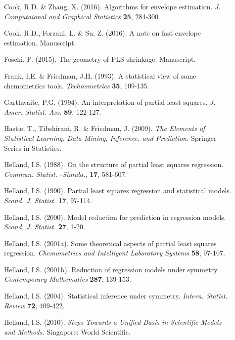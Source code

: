 \documentclass[11pt]{article}
\begin{document}
\begin{description}
\item[] Cook, R.D. \& Zhang, X. (2016). Algorithms for envelope estimation. \textit{J. Computaional and Graphical Statistics} \textbf{25}, 284-300.

\item[] Cook, R.D., Forzani, L. \& Su, Z. (2016). A note on fast envelope estimation. Manuscript.

\item[] Foschi, P. (2015). The geometry of PLS shrinkage. Manuscript.

\item[] Frank, I.E. \& Friedman, J.H. (1993). A statistical view of some chemometrics tools. \textit{Technometrics} \textbf{35}, 109-135.

\item[] Garthwaite, P.G. (1994). An interpretation of partial least squares. \textit{J. Amer. Statist. Ass.} \textbf{89}, 122-127.

\item[] Hastie, T., Tibshirani, R. \& Friedman, J. (2009). \textit{The Elements of Statistical Learning. Data Mining, Inference, and Prediction.} Springer Series in Statistics.


\item[] Helland, I.S. (1988). On the structure of partial least squares regression. \textit{Commun. Statist. -Simula.,} \textbf{17}, 581-607.

\item[] Helland, I.S. (1990). Partial least squares regression and statistical models. \textit{Scand. J. Statist.} \textbf{17}, 97-114.

\item[] Helland, I.S. (2000). Model reduction for prediction in regression models. \textit{Scand. J. Statist.} \textbf{27}, 1-20.

\item[] Helland, I.S. (2001a). Some theoretical aspects of partial least squares regression. \textit{Chemometrics and Intelligent Laboratory Systems} 
\textbf{58}, 97-107.

\item[] Helland, I.S. (2001b). Reduction of regression models under symmetry. \textit{Contemporary Mathematics} \textbf{287}, 139-153.

\item[] Helland, I.S. (2004). Statistical inference under symmetry. \textit{Intern. Statist. Review} \textbf{72}, 409-422.

\item[] Helland, I.S. (2010). \textit{Steps Towards a Unified Basis in Scientific Models and Methods.} Singapore: World Scientific.


\end{description}
\end{document}
